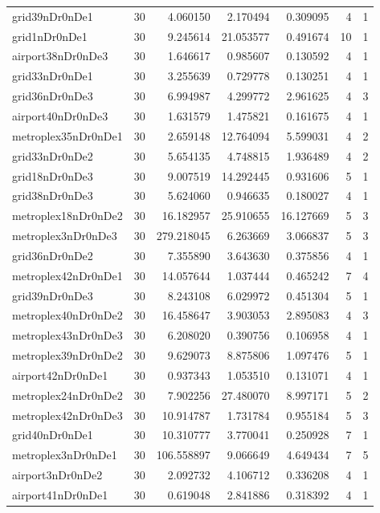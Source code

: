 \documentclass[../../../thesis.tex]{subfiles}
\begin{document}
\begin{longtable}{|l|r|r|r|r|r|r|}
grid39nDr0nDe1 & 30 & 4.060150 & 2.170494 & 0.309095 & 4 & 1 \\
grid1nDr0nDe1 & 30 & 9.245614 & 21.053577 & 0.491674 & 10 & 1 \\
airport38nDr0nDe3 & 30 & 1.646617 & 0.985607 & 0.130592 & 4 & 1 \\
grid33nDr0nDe1 & 30 & 3.255639 & 0.729778 & 0.130251 & 4 & 1 \\
grid36nDr0nDe3 & 30 & 6.994987 & 4.299772 & 2.961625 & 4 & 3 \\
airport40nDr0nDe3 & 30 & 1.631579 & 1.475821 & 0.161675 & 4 & 1 \\
metroplex35nDr0nDe1 & 30 & 2.659148 & 12.764094 & 5.599031 & 4 & 2 \\
grid33nDr0nDe2 & 30 & 5.654135 & 4.748815 & 1.936489 & 4 & 2 \\
grid18nDr0nDe3 & 30 & 9.007519 & 14.292445 & 0.931606 & 5 & 1 \\
grid38nDr0nDe3 & 30 & 5.624060 & 0.946635 & 0.180027 & 4 & 1 \\
metroplex18nDr0nDe2 & 30 & 16.182957 & 25.910655 & 16.127669 & 5 & 3 \\
metroplex3nDr0nDe3 & 30 & 279.218045 & 6.263669 & 3.066837 & 5 & 3 \\
grid36nDr0nDe2 & 30 & 7.355890 & 3.643630 & 0.375856 & 4 & 1 \\
metroplex42nDr0nDe1 & 30 & 14.057644 & 1.037444 & 0.465242 & 7 & 4 \\
grid39nDr0nDe3 & 30 & 8.243108 & 6.029972 & 0.451304 & 5 & 1 \\
metroplex40nDr0nDe2 & 30 & 16.458647 & 3.903053 & 2.895083 & 4 & 3 \\
metroplex43nDr0nDe3 & 30 & 6.208020 & 0.390756 & 0.106958 & 4 & 1 \\
metroplex39nDr0nDe2 & 30 & 9.629073 & 8.875806 & 1.097476 & 5 & 1 \\
airport42nDr0nDe1 & 30 & 0.937343 & 1.053510 & 0.131071 & 4 & 1 \\
metroplex24nDr0nDe2 & 30 & 7.902256 & 27.480070 & 8.997171 & 5 & 2 \\
metroplex42nDr0nDe3 & 30 & 10.914787 & 1.731784 & 0.955184 & 5 & 3 \\
grid40nDr0nDe1 & 30 & 10.310777 & 3.770041 & 0.250928 & 7 & 1 \\
metroplex3nDr0nDe1 & 30 & 106.558897 & 9.066649 & 4.649434 & 7 & 5 \\
airport3nDr0nDe2 & 30 & 2.092732 & 4.106712 & 0.336208 & 4 & 1 \\
airport41nDr0nDe1 & 30 & 0.619048 & 2.841886 & 0.318392 & 4 & 1 \\

\end{longtable}
\end{document}
